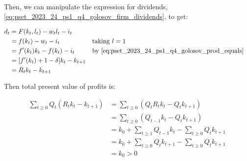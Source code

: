 Then, we can manipulate the expression for dividends, \eqref{eq:pset_2023_24_ps1_q4_golosov_firm_dividends}, to get:

\begin{align}
    d_t &= F(k_t, l_t) - w_tl_t - i_t \\
    &= f(k_t) - w_t - i_t && \text{taking $l = 1$} \\
    &= f'(k_t)k_t - f(k_t) - i_t && \text{by \eqref{eq:pset_2023_24_ps1_q4_golosov_prod_equals}} \\
    &= [f'(k_t) + 1 - \delta]k_t - k_{t+1} \\
    &= R_tk_t - k_{t+1}
\end{align}

Then total present value of profits is:

\begin{align}
    \sum_{t \geq 0} Q_t\left(R_t k_t-k_{t+1}\right) & =\sum_{t \geq 0}\left(Q_t R_t k_t-Q_t k_{t+1}\right) \\
    & =\sum_{t \geq 0}\left(Q_{t-1} k_t-Q_t k_{t+1}\right) \\
    & =k_0+\sum_{t \geq 1} Q_{t-1} k_t-\sum_{t \geq 0} Q_t k_{t+1} \\
    & =k_0+\sum_{t \geq 0} Q_t k_{t+1}-\sum_{t \geq 0} Q_t k_{t+1} \\
    & =k_0>0
\end{align}